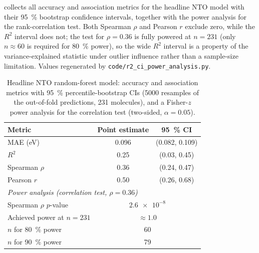 \documentclass[final,3p,times,twocolumn]{elsarticle}
\begin{document}
 collects all accuracy and association metrics for the
headline NTO model with their \qty{95}{\percent} bootstrap confidence intervals,
together with the power analysis for the rank-correlation test. Both Spearman
$\rho$ and Pearson $r$ exclude zero, while the $R^2$ interval does not; the
test for $\rho = 0.36$ is fully powered at $n = 231$ (only $n \approx 60$ is
required for \qty{80}{\percent} power), so the wide $R^2$ interval is a property
of the variance-explained statistic under outlier influence rather than a
sample-size limitation. Values regenerated by
\texttt{code/r2\_ci\_power\_analysis.py}.

\begin{table}[htbp]
  \centering
  \caption{Headline NTO random-forest model: accuracy and association metrics
    with \qty{95}{\percent} percentile-bootstrap CIs (\num{5000} resamples of the
    out-of-fold predictions, \num{231} molecules), and a Fisher-$z$ power analysis
    for the correlation test (two-sided, $\alpha = 0.05$).}
  \label{tab:metrics_ci}
  \footnotesize\setlength{\tabcolsep}{3pt}
  \begin{tabular}{lcc}
    \toprule
    Metric & Point estimate & \qty{95}{\percent} CI \\
    \midrule
    MAE (eV)            & 0.096 & (0.082, 0.109) \\
    $R^2$               & 0.25  & (0.03, 0.45) \\
    Spearman $\rho$     & 0.36  & (0.24, 0.47) \\
    Pearson $r$         & 0.50  & (0.26, 0.68) \\
    \midrule
    \multicolumn{3}{l}{\emph{Power analysis (correlation test, $\rho = 0.36$)}} \\
    Spearman $\rho$ $p$-value     & \multicolumn{2}{c}{$\num{2.6e-8}$} \\
    Achieved power at $n = 231$   & \multicolumn{2}{c}{$\approx 1.0$} \\
    $n$ for \qty{80}{\percent} power & \multicolumn{2}{c}{60} \\
    $n$ for \qty{90}{\percent} power & \multicolumn{2}{c}{79} \\
    \bottomrule
  \end{tabular}
\end{table}
\end{document}
